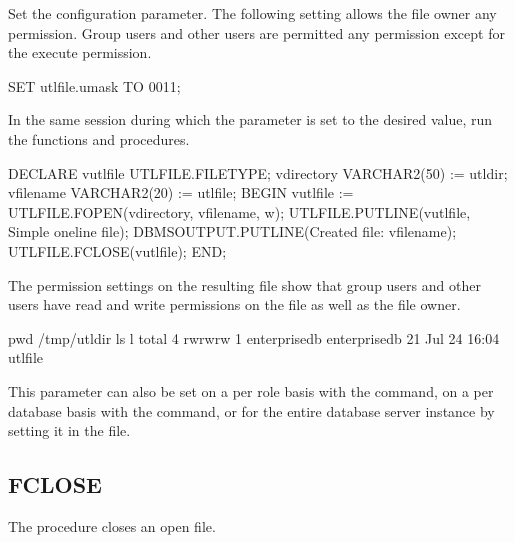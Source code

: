 \documentclass[letterpaper,10pt,english,openany,oneside]{sphinxmanual}
\begin{document}
Set the  configuration parameter. The following setting
allows the file owner any permission. Group users and other users are
permitted any permission except for the execute permission.

%
\begin{sphinxVerbatim}[commandchars=\\\{\}]
SET utl\PYGZus{}file.umask TO \PYGZsq{}0011\PYGZsq{};
\end{sphinxVerbatim}

In the same session during which the  parameter is set to
the desired value, run the  functions and procedures.

%
\begin{sphinxVerbatim}[commandchars=\\\{\}]
DECLARE
    v\PYGZus{}utlfile       UTL\PYGZus{}FILE.FILE\PYGZus{}TYPE;
    v\PYGZus{}directory     VARCHAR2(50) := \PYGZsq{}utldir\PYGZsq{};
    v\PYGZus{}filename      VARCHAR2(20) := \PYGZsq{}utlfile\PYGZsq{};
BEGIN
    v\PYGZus{}utlfile := UTL\PYGZus{}FILE.FOPEN(v\PYGZus{}directory, v\PYGZus{}filename, \PYGZsq{}w\PYGZsq{});
    UTL\PYGZus{}FILE.PUT\PYGZus{}LINE(v\PYGZus{}utlfile, \PYGZsq{}Simple one\PYGZhy{}line file\PYGZsq{});
    DBMS\PYGZus{}OUTPUT.PUT\PYGZus{}LINE(\PYGZsq{}Created file: \PYGZsq{} \textbar{}\textbar{} v\PYGZus{}filename);
    UTL\PYGZus{}FILE.FCLOSE(v\PYGZus{}utlfile);
END;
\end{sphinxVerbatim}

The permission settings on the resulting file show that group users and other users have read and write permissions on the file as well as the file owner.

%
\begin{sphinxVerbatim}[commandchars=\\\{\}]
\PYGZdl{} pwd
/tmp/utldir
\PYGZdl{} ls \PYGZhy{}l
total 4
\PYGZhy{}rw\PYGZhy{}rw\PYGZhy{}rw\PYGZhy{} 1 enterprisedb enterprisedb 21 Jul 24 16:04 utlfile
\end{sphinxVerbatim}

This parameter can also be set on a per role basis with the 
command, on a per database basis with the  command, or for
the entire database server instance by setting it in the 
file.


\subsection{FCLOSE}
\label{\detokenize{utl_file:fclose}}
The  procedure closes an open file.
\begin{quote}

\end{quote}
\end{document}
